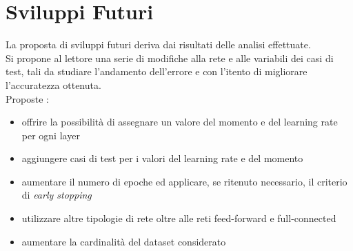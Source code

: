 \chapter{Sviluppi Futuri}
La proposta di sviluppi futuri deriva dai risultati delle analisi effettuate.\\
Si propone al lettore una serie di modifiche alla rete e alle variabili dei casi di test, tali da studiare l'andamento dell'errore e con l'itento di migliorare l'accuratezza ottenuta. \\
Proposte :
\begin{itemize}
    \item offrire la possibilità di assegnare un valore del momento e del learning rate per ogni layer
    \item aggiungere casi di test per i valori del learning rate e del momento
    \item aumentare il numero di epoche ed applicare, se ritenuto necessario, il criterio di \textit{early stopping}
    \item utilizzare altre tipologie di rete oltre alle reti feed-forward e full-connected
    \item aumentare la cardinalità del dataset considerato
\end{itemize}